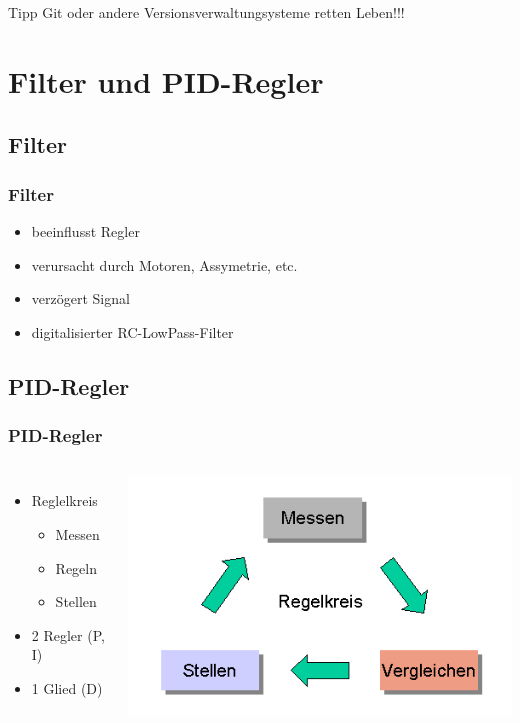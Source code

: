 \documentclass[12pt,a4paper, ngerman]{beamer}
\begin{document}
\begin{frame}
\begin{alertblock}{Tipp}
Git oder andere Versionsverwaltungsysteme retten Leben!!!
\end{alertblock}
\end{frame}

\section{Filter und PID-Regler}
\subsection{Filter}

\begin{frame}
\frametitle{Filter}
\begin{itemize}
\item beeinflusst Regler
\item verursacht durch Motoren, Assymetrie, etc.
\item verzögert Signal
\item digitalisierter RC-LowPass-Filter
\end{itemize}
\end{frame}

\subsection{PID-Regler}

\begin{frame}
\frametitle{PID-Regler}
\begin{columns}
\begin{itemize}
\item Reglelkreis
	\begin{itemize}
	\item Messen
	\item Regeln
	\item Stellen
	\end{itemize}
\item 2 Regler (P, I)
\item 1 Glied (D)
\end{itemize}
\includegraphics[width=1\textwidth]{Regelkreis1.png}
\end{columns}
\end{frame}
\end{document}
